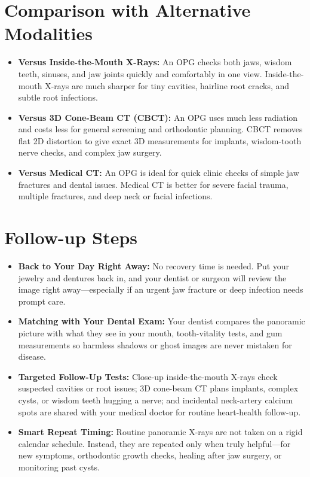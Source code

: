 \section{Comparison with Alternative Modalities}
\begin{itemize}
\item \textbf{Versus Inside-the-Mouth X-Rays:} An OPG checks both jaws, wisdom teeth, sinuses, and jaw joints quickly and comfortably in one view. Inside-the-mouth X-rays are much sharper for tiny cavities, hairline root cracks, and subtle root infections.
\item \textbf{Versus 3D Cone-Beam CT (CBCT):} An OPG uses much less radiation and costs less for general screening and orthodontic planning. CBCT removes flat 2D distortion to give exact 3D measurements for implants, wisdom-tooth nerve checks, and complex jaw surgery.
\item \textbf{Versus Medical CT:} An OPG is ideal for quick clinic checks of simple jaw fractures and dental issues. Medical CT is better for severe facial trauma, multiple fractures, and deep neck or facial infections.
\end{itemize}

\section{Follow-up Steps}
\begin{itemize}
\item \textbf{Back to Your Day Right Away:} No recovery time is needed. Put your jewelry and dentures back in, and your dentist or surgeon will review the image right away---especially if an urgent jaw fracture or deep infection needs prompt care.
\item \textbf{Matching with Your Dental Exam:} Your dentist compares the panoramic picture with what they see in your mouth, tooth-vitality tests, and gum measurements so harmless shadows or ghost images are never mistaken for disease.
\item \textbf{Targeted Follow-Up Tests:} Close-up inside-the-mouth X-rays check suspected cavities or root issues; 3D cone-beam CT plans implants, complex cysts, or wisdom teeth hugging a nerve; and incidental neck-artery calcium spots are shared with your medical doctor for routine heart-health follow-up.
\item \textbf{Smart Repeat Timing:} Routine panoramic X-rays are not taken on a rigid calendar schedule. Instead, they are repeated only when truly helpful---for new symptoms, orthodontic growth checks, healing after jaw surgery, or monitoring past cysts.
\end{itemize}

